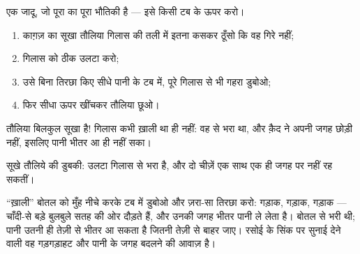 \begin{method}[सूखे तौलिये की डुबकी]\label{met:g2:air-around-us:drytowel}
एक जादू, जो पूरा का पूरा भौतिकी है --- इसे किसी टब के ऊपर करो।
\begin{enumerate}
  \item काग़ज़ का सूखा तौलिया गिलास की तली में इतना कसकर ठूँसो कि वह
        गिरे नहीं;
  \item गिलास को ठीक उलटा करो;
  \item उसे बिना तिरछा किए सीधे पानी के टब में, पूरे गिलास से भी गहरा
        डुबोओ;
  \item फिर सीधा ऊपर खींचकर तौलिया छूओ।
\end{enumerate}
तौलिया बिलकुल सूखा है! गिलास कभी ख़ाली था ही नहीं: वह  से भरा था,
और क़ैद  ने अपनी जगह छोड़ी नहीं, इसलिए पानी भीतर आ ही नहीं सका।
\end{method}

\begin{omfigure}

{\small सूखे तौलिये की डुबकी: उलटा गिलास  से भरा है, और दो चीज़ें
एक साथ एक ही जगह पर नहीं रह सकतीं।}
\end{omfigure}

\begin{example}[गड़गड़ाती बोतल]\label{ex:g2:air-around-us:glug}
``ख़ाली'' बोतल को मुँह नीचे करके टब में डुबोओ और ज़रा-सा तिरछा करो:
गड़ाक, गड़ाक, गड़ाक --- चाँदी-से बड़े बुलबुले सतह की ओर दौड़ते हैं,
और उनकी जगह भीतर पानी ले लेता है। बोतल  से भरी थी; पानी उतनी ही
तेज़ी से भीतर आ सकता है जितनी तेज़ी से  बाहर जाए। रसोई के सिंक पर
सुनाई देने वाली वह गड़गड़ाहट  और पानी के जगह बदलने की आवाज़ है।
\end{example}

